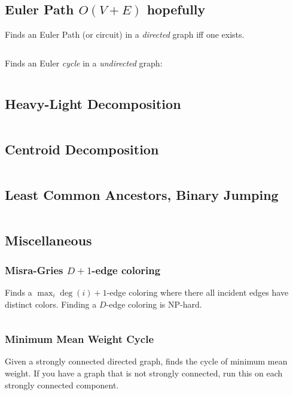 \documentclass[8pt,a4paper,landscape,oneside]{amsart}
\newcommand{\mintedstyle}[2]{\inputminted[fontsize=\normalsize,baselinestretch=.9,breaklines,breakautoindent,tabsize=2]{#1}{code/#2}}
\newcommand{\code}[1]{\mintedstyle{cpp}{#1}}
\begin{document}
\begin{multicols*}{3}
\code{graphs/mst_kruskal.cpp}

\subsection{Euler Path $O(V+E)$ hopefully}
Finds an Euler Path (or circuit) in a \emph{directed} graph iff one exists.
\code{graphs/euler_path.cpp}
Finds an Euler \emph{cycle} in a \emph{undirected} graph:
\code{graphs/euler_path_undirected.cpp}

\subsection{Heavy-Light Decomposition}
\code{graphs/hld.cpp}

\subsection{Centroid Decomposition}
\code{graphs/centroid_decomposition.cpp}

\subsection{Least Common Ancestors, Binary Jumping}
\code{graphs/lca.cpp}


\subsection{Miscellaneous}

\subsubsection{Misra-Gries $D+1$-edge coloring}
Finds a $\max_i \deg(i) + 1$-edge coloring where there all incident edges have distinct colors.
Finding a $D$-edge coloring is NP-hard.
\code{graphs/MisraGries.cpp}

\subsubsection{Minimum Mean Weight Cycle}
Given a strongly connected directed graph, finds the cycle of minimum
mean weight. If you have a graph that is not strongly connected, run
this on each strongly connected component.
\code{graphs/min_mean_cycle.cpp}


\end{multicols*}
\end{document}
